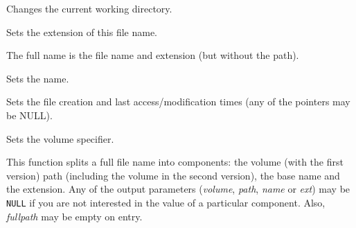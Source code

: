 

Changes the current working directory.


\label{wxfilenamesetext}


Sets the extension of this file name.


\label{wxfilenamesetfullname}


The full name is the file name and extension (but without the path).


\label{wxfilenamesetname}


Sets the name.


\label{wxfilenamesettimes}


Sets the file creation and last access/modification times (any of the pointers may be NULL).


\label{wxfilenamesetvolume}


Sets the volume specifier.


\label{wxfilenamesplitpath}



This function splits a full file name into components: the volume (with the
first version) path (including the volume in the second version), the base name
and the extension. Any of the output parameters ({\it volume}, {\it path}, 
{\it name} or {\it ext}) may be {\tt NULL} if you are not interested in the
value of a particular component. Also, {\it fullpath} may be empty on entry.

